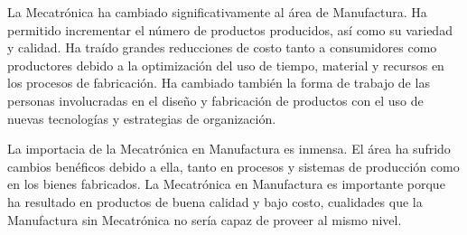 \documentclass[a4paper,12pt]{article}
\begin{document}
La Mecatrónica ha cambiado significativamente al área de Manufactura.
Ha permitido incrementar el número de productos producidos, así como su variedad y calidad.
Ha traído grandes reducciones de costo tanto a consumidores como productores debido a la optimización del uso de tiempo, material y recursos en los procesos de fabricación.
Ha cambiado también la forma de trabajo de las personas involucradas en el diseño y fabricación de productos con el uso de nuevas tecnologías y estrategias de organización.

La importacia de la Mecatrónica en Manufactura es inmensa.
El área ha sufrido cambios benéficos debido a ella, tanto en procesos y sistemas de producción como en los bienes fabricados.
La Mecatrónica en Manufactura es importante porque ha resultado en productos de buena calidad y bajo costo, cualidades que la Manufactura sin Mecatrónica no sería capaz de proveer al mismo nivel.


% 
\end{document}
